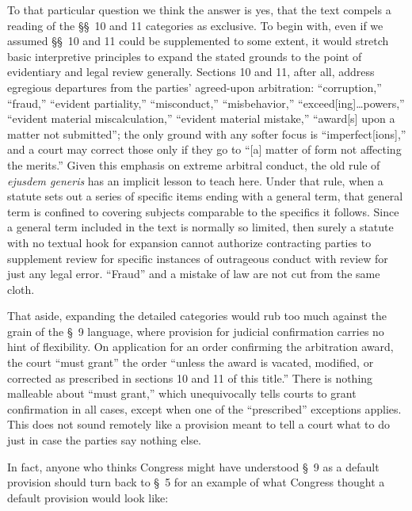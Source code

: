   To that particular question we think the answer is yes, that
the text compels a reading of the \S\S~10 and 11 categories as
exclusive. To begin with, even if we assumed \S\S~10 and 11
could be supplemented to some extent, it would stretch basic
interpretive principles to expand the stated grounds to the point of
evidentiary and legal review generally. Sections 10 and 11, after
all, address egregious departures from the parties' agreed-upon
arbitration: ``corruption,'' ``fraud,'' ``evident partiality,''
``misconduct,'' ``misbehavior,'' ``exceed[ing]\dots powers,''
``evident material miscalculation,'' ``evident material mistake,''
``award[s] upon a matter not submitted''; the only ground with any
softer focus is ``imperfect[ions],'' and a court may correct those
only if they go to ``[a] matter of form not affecting the merits.''
Given this emphasis on extreme arbitral conduct, the old rule of
\emph{ejusdem generis} has an implicit lesson to teach here. Under that
rule, when a statute sets out a series of specific items ending with
a general term, that general term is confined to covering subjects
comparable to the specifics it follows. Since a general term included in
the text is normally so limited, then surely a statute with no textual
hook for expansion cannot authorize contracting parties to supplement
review for specific instances of outrageous conduct with review for just
any legal error. ``Fraud'' and a mistake of law are not cut from the
same cloth.\newpage 

  That aside, expanding the detailed categories would rub too much
against the grain of the \S~9 language, where provision for judicial
confirmation carries no hint of flexibility. On application for an
order confirming the arbitration award, the court ``must grant''
the order ``unless the award is vacated, modified, or corrected as
prescribed in sections 10 and 11 of this title.'' There is nothing
malleable about ``must grant,'' which unequivocally tells courts to
grant confirmation in all cases, except when one of the ``prescribed''
exceptions applies. This does not sound remotely like a provision
meant to tell a court what to do just in case the parties say nothing
else.\footnotemark[6]

  In fact, anyone who thinks Congress might have understood \S~9 as
a default provision should turn back to \S~5 for an example of what
Congress thought a default provision would look like:


